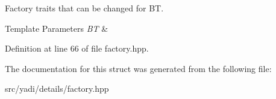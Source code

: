 Factory traits that can be changed for BT. 


\begin{DoxyTemplParams}{Template Parameters}
{\em BT} & \\
\hline
\end{DoxyTemplParams}


Definition at line 66 of file factory.\+hpp.



The documentation for this struct was generated from the following file\+:\begin{DoxyCompactItemize}
\item 
src/yadi/details/factory.\+hpp\end{DoxyCompactItemize}
